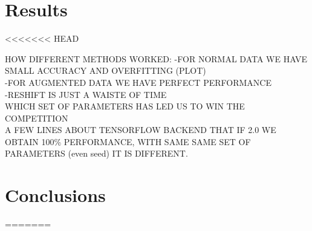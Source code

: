 \documentclass[prl,twocolumn]{revtex4-1}
\begin{document}
\section{Results}
<<<<<<< HEAD

HOW DIFFERENT METHODS WORKED:
-FOR NORMAL DATA WE HAVE SMALL ACCURACY AND OVERFITTING (PLOT)\\
-FOR AUGMENTED DATA WE HAVE PERFECT PERFORMANCE\\
-RESHIFT IS JUST A WAISTE OF TIME\\

WHICH SET OF PARAMETERS HAS LED US TO WIN THE COMPETITION\\

A FEW LINES ABOUT TENSORFLOW BACKEND THAT IF 2.0 WE OBTAIN 100\% PERFORMANCE, WITH SAME SAME SET OF PARAMETERS (even seed) IT IS DIFFERENT. \\


\section{Conclusions}

=======
\end{document}
